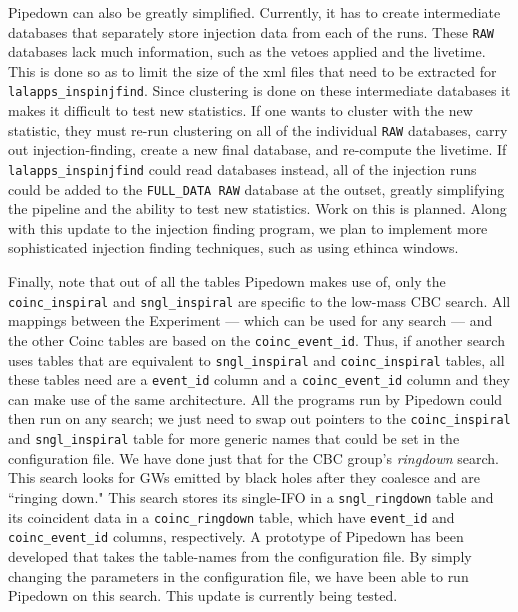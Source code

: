 Pipedown can also be greatly simplified. Currently, it has to create intermediate databases that separately store injection data from each of the runs. These \verb|RAW| databases lack much information, such as the vetoes applied and the livetime. This is done so as to limit the size of the xml files that need to be extracted for \verb|lalapps_inspinjfind|. Since clustering is done on these intermediate databases it makes it difficult to test new statistics. If one wants to cluster with the new statistic, they must re-run clustering on all of the individual \verb|RAW| databases, carry out injection-finding, create a new final database, and re-compute the livetime. If \verb|lalapps_inspinjfind| could read databases instead, all of the injection runs could be added to the \verb|FULL_DATA RAW| database at the outset, greatly simplifying the pipeline and the ability to test new statistics. Work on this is planned. Along with this update to the injection finding program, we plan to implement more sophisticated injection finding techniques, such as using ethinca windows.

Finally, note that out of all the tables Pipedown makes use of, only the \verb|coinc_inspiral| and \verb|sngl_inspiral| are specific to the low-mass \ac{CBC} search. All mappings between the Experiment --- which can be used for any search --- and the other Coinc tables are based on the \verb|coinc_event_id|. Thus, if another search uses tables that are equivalent to \verb|sngl_inspiral| and \verb|coinc_inspiral| tables, all these tables need are a \verb|event_id| column and a \verb|coinc_event_id| column and they can make use of the same architecture. All the programs run by Pipedown could then run on any search; we just need to swap out pointers to the \verb|coinc_inspiral| and \verb|sngl_inspiral| table for more generic names that could be set in the configuration file. We have done just that for the \ac{CBC} group's \emph{ringdown} search. This search looks for \acp{GW} emitted by black holes after they coalesce and are ``ringing down." This search stores its single-\ac{IFO} in a \verb|sngl_ringdown| table and its coincident data in a \verb|coinc_ringdown| table, which have \verb|event_id| and \verb|coinc_event_id| columns, respectively. A prototype of Pipedown has been developed that takes the table-names from the configuration file. By simply changing the parameters in the configuration file, we have been able to run Pipedown on this search. This update is currently being tested.


